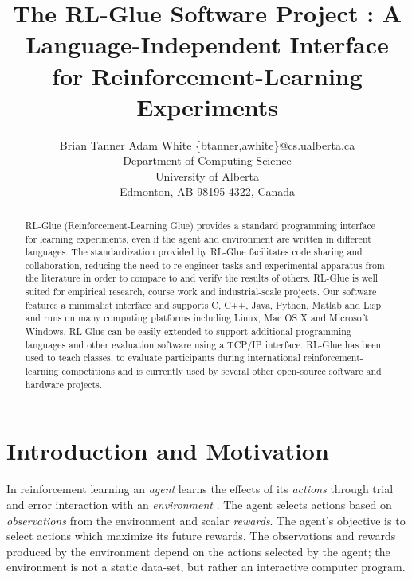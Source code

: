 \documentclass[twoside,11pt]{article}
\begin{document}
\title{The RL-Glue Software Project : A Language-Independent Interface for Reinforcement-Learning Experiments}


\author{\name Brian Tanner \AND Adam White  \email \{btanner,awhite\}@cs.ualberta.ca \\
       \addr Department of Computing Science\\
       University of Alberta\\
       Edmonton, AB 98195-4322, Canada}


\maketitle

\begin{abstract}%
RL-Glue (Reinforcement-Learning Glue) provides a standard programming interface for learning experiments, even if the agent and environment are written in different languages. 
The standardization provided by RL-Glue facilitates code sharing and collaboration, reducing the need to re-engineer tasks and experimental apparatus from the literature in order to compare to and verify the results of others.
RL-Glue is well suited for empirical research, course work and industrial-scale projects. Our software features a minimalist interface and supports C, C++, Java, Python, Matlab and Lisp and runs on many computing platforms including Linux, Mac OS X and Microsoft Windows. RL-Glue can be easily extended to support additional programming languages and other evaluation software using a TCP/IP interface. RL-Glue has been used to teach classes, to evaluate participants during international reinforcement-learning competitions and is currently used by several other open-source software and hardware projects.
\end{abstract}

\section{Introduction and Motivation}
In reinforcement learning an {\it agent} learns the effects of its {\it actions} through trial and error interaction with an {\it environment} \citep{rlbook, rlsurvey,ndp}. The agent selects actions based on {\it observations} from the environment and scalar {\it rewards}. The agent's objective is to select actions which maximize its future rewards. The observations and rewards produced by the environment depend on the actions selected by the agent; the environment is not a static data-set, but rather an interactive computer program.
\end{document}
